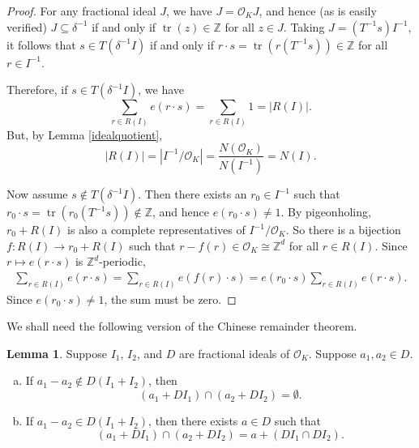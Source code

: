 \documentclass{amsart}
\numberwithin{equation}{section}
\theoremstyle{definition}
\newtheorem{lemma}[theorem]{Lemma}
\theoremstyle{definition}
\def\ZZ{\mathbb{Z}}
\newcommand{\OK}{\mathcal{O}_K}
\newcommand{\isom}{\cong}
\DeclareMathOperator{\tr}{tr}
\begin{document}
\begin{proof}
For any fractional ideal $J$, we have $J=\OK J$, and hence (as is easily verified)  $J \subseteq \delta^{-1}$ if and only if $\tr(z) \in \ZZ$ for all $z \in J$. 
Taking 
$J = (T^{-1} s) I^{-1}$, it follows that $s \in T(\delta^{-1}I)$ if and only if $r \cdot s =  \tr(r (T^{-1} s)) \in \ZZ$ for all $r \in I^{-1}$. 


Therefore, if $s \in T(\delta^{-1} I)$, we have  
\[
\sum_{r \in R(I)} e(r \cdot s) = \sum_{r \in R(I)} 1 = |R(I)|.
\]
But, by Lemma \ref{idealquotient}, 
\[
|R(I)| = |I^{-1} / \OK| 
= \dfrac{N(\OK)}{N(I^{-1})} 
= N(I).
\]

Now assume $s \notin T(\delta^{-1} I)$. 
Then there exists an $r_0 \in I^{-1}$ such that $r_0 \cdot s = \tr(r_0(T^{-1}s)) \notin \ZZ$, and hence $e(r_0 \cdot s) \neq 1$. 
By pigeonholing, $r_0 + R(I)$ is also a complete representatives of $I^{-1}/\OK$.
So there is a bijection $f:R(I) \to r_0 + R(I)$ such that $r - f(r) \in \OK \isom \ZZ^d$ for all $r \in R(I)$. 
Since $r \mapsto e(r \cdot s)$ is $\ZZ^d$-periodic, 
\[
\begin{split}
\sum_{r \in R(I)} e(r \cdot s)  
= \sum_{r \in R(I)} e(f(r) \cdot s)
= e(r_0 \cdot s) \sum_{r \in R(I)} e(r \cdot s).
\end{split}
\]
Since $e(r_0 \cdot s) \neq 1$, 
the sum must be zero.
\end{proof}



We shall need the following version of the Chinese remainder theorem. 

\begin{lemma}\label{concrete crt lemma}
Suppose $I_1$, $I_2$, and $D$ are fractional ideals of $\OK$. 
Suppose $a_1, a_2 \in D$. 
\begin{enumerate}[(a)]
\item If $a_1 - a_2 \notin D(I_1 + I_2)$, then
\[(a_1 + DI_1) \cap (a_2 + DI_2) = \emptyset.\]
\item If $a_1 - a_2 \in D(I_1 + I_2)$, then there exists $a \in D$ such that 
$$
(a_1 + DI_1) \cap (a_2 + DI_2) = a + (D I_1 \cap DI_2).
$$
\end{enumerate}
\end{lemma}
\end{document}
